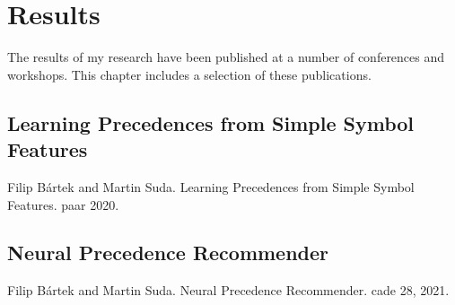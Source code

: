 \chapter{Results}

The results of my research have been published at a number of conferences and workshops.
This chapter includes a selection of these publications.

%


\section{Learning Precedences from Simple Symbol Features}
\label{sec:results:simple}

Filip Bártek and Martin Suda. Learning Precedences from Simple Symbol Features. \Gls{paar} 2020. \cite{DBLP:conf/cade/Bartek020}




\section{Neural Precedence Recommender}
\label{sec:results:npr}

Filip Bártek and Martin Suda. Neural Precedence Recommender. \Gls{cade} 28, 2021. \cite{DBLP:conf/cade/Bartek021}

